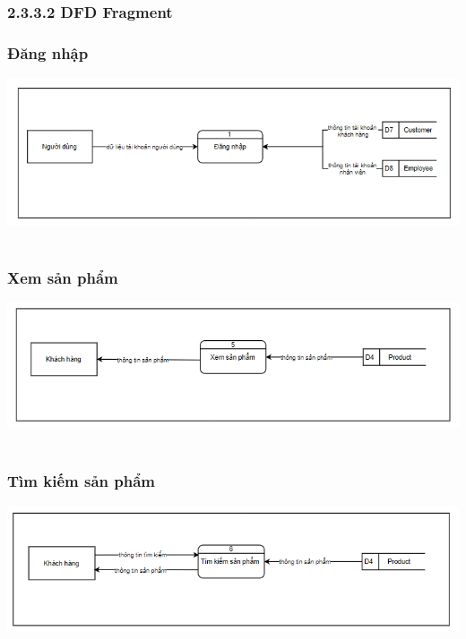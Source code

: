 \documentclass[12pt,a4paper,2sides]{report}
\begin{document}
\subsubsection{2.3.3.2 DFD Fragment}
    \subsubsection{Đăng nhập}
    \includegraphics[width=1\linewidth]{lib/DFD/dangnhap.png}\\\vspace*{1cm}
    \hspace{5cm}{Hình 3. đăng nhập}\\
\subsubsection{Xem sản phẩm}
    \includegraphics[width=1\linewidth]{lib/DFD/xemsp.png}\\\vspace*{1cm}
    \hspace{5cm}{Hình 4. Xem sản phẩm}\\
\subsubsection{Tìm kiếm sản phẩm}
    \includegraphics[width=1\linewidth]{lib/DFD/timkiemsp.png}\\\vspace*{1cm}
    \hspace{5cm}{Hình 5. Tìm kiếm sản phẩm}\\
\end{document}

